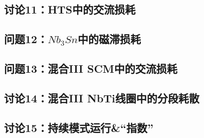 \newpage
\subsection{讨论11：HTS中的交流损耗}

\newpage
\subsection{问题12：$Nb_3Sn$中的磁滞损耗}

\newpage
\subsection{问题13：混合III SCM中的交流损耗}

\newpage
\subsection{讨论14：混合III NbTi线圈中的分段耗散}

\newpage
\subsection{讨论15：持续模式运行\&“指数”}

